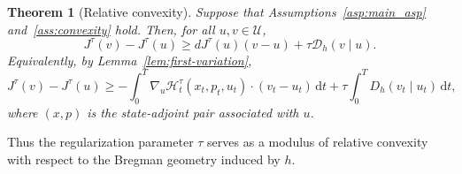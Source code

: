 \documentclass[11pt]{amsart}
\theoremstyle{plain}
\newtheorem{theorem}{Theorem}
\theoremstyle{definition}
\theoremstyle{remark}
\newcommand{\dd}{\,\mathrm{d}}
\begin{document}
\begin{theorem}[Relative convexity]\label{thm:relative-convexity}
Suppose that Assumptions~\ref{asp:main_asp} and~\ref{ass:convexity} hold. Then, for all $u,v\in\mathcal U$,
\begin{equation}\label{eq:relative-convexity}
J^\tau(v)-J^\tau(u)
\ge
dJ^\tau(u)(v-u)+\tau \mathcal{D}_h(v\mid u).
\end{equation}
Equivalently, by Lemma~\ref{lem:first-variation},
\begin{equation}\label{eq:relative-convexity-H}
J^\tau(v)-J^\tau(u)
\ge
- \int_0^T \nabla_u \mathcal H_t^\tau(x_t,p_t,u_t)\cdot (v_t-u_t)\dd t
+
\tau\int_0^T D_h(v_t\mid u_t)\dd t,
\end{equation}
where $(x,p)$ is the state-adjoint pair associated with $u$.
\end{theorem}

Thus the regularization parameter $\tau$ serves as a modulus of relative convexity with respect to the Bregman geometry induced by $h$.
\end{document}
